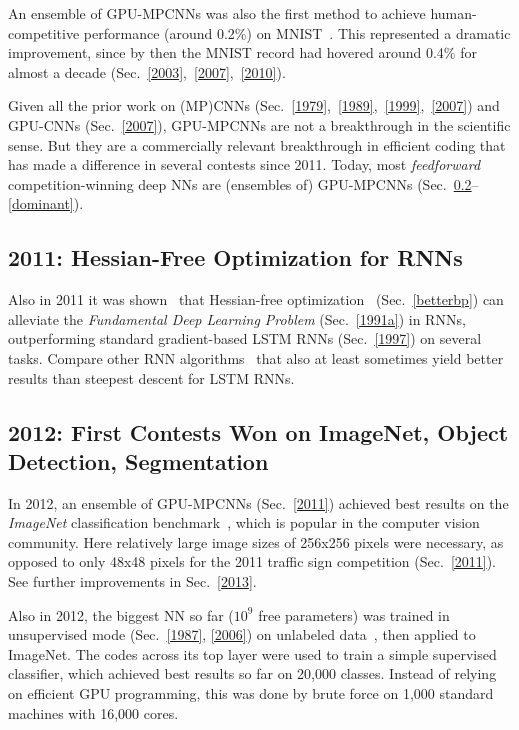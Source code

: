 \documentclass[letterpaper]{article}
\begin{document}
\begin{CJK*}{UTF8}{gbsn}
\begin{sloppypar}
An ensemble of GPU-MPCNNs was also the first method to achieve
human-competitive performance (around 0.2\%) on MNIST~\citep{ciresan2012cvpr}. 
This represented a dramatic improvement, since
by then the MNIST record had hovered around 0.4\% for almost a decade 
(Sec.~\ref{2003},~\ref{2007},~\ref{2010}). 

Given all the prior work on (MP)CNNs (Sec.~\ref{1979},~\ref{1989},~\ref{1999},~\ref{2007}) and GPU-CNNs (Sec.~\ref{2007}), 
GPU-MPCNNs are not a breakthrough in the scientific sense. 
But they are a commercially relevant breakthrough in efficient coding that has made a
difference in several contests since 2011. 
Today, most {\em feedforward} competition-winning deep NNs are (ensembles of) 
GPU-MPCNNs (Sec.~\ref{2012}--\ref{dominant}).

\subsection{2011: Hessian-Free Optimization for RNNs}
\label{2011rnn}

Also in 2011 it was shown~\citep{Martens:2011hessfree} that 
Hessian-free optimization~\citep[e.g.,][]{Moller:93,Pearlmutter:93,schraudolph02} (Sec.~\ref{betterbp})
can alleviate the 
{\em Fundamental Deep Learning Problem} (Sec.~\ref{1991a})
in RNNs, outperforming standard gradient-based 
LSTM RNNs (Sec.~\ref{1997}) on several tasks.
Compare other  RNN algorithms~\citep{Jaeger:04,Schmidhuber:07nc,pascanu2013,icml2014}
that also at least sometimes yield better results than steepest descent for LSTM RNNs.




\subsection{2012: First Contests Won on ImageNet, Object Detection, Segmentation}
\label{2012}

In 2012, an ensemble of GPU-MPCNNs (Sec.~\ref{2011}) 
achieved best results on the {\em ImageNet} classification benchmark~\citep{Krizhevsky:2012},
which is popular in the computer vision community.
Here relatively large image sizes of  256x256 pixels were necessary, 
as opposed to only 48x48 pixels for the 2011 traffic sign competition (Sec.~\ref{2011}).
See further improvements in Sec.~\ref{2013}.

Also in 2012, the biggest NN so far ($10^9$ free parameters) was trained
in unsupervised mode (Sec.~\ref{1987}, \ref{2006}) on unlabeled data~\citep{ng2012}, then applied to ImageNet. The codes across its top layer 
were used to train a simple supervised classifier,
which achieved best results so far on 20,000 classes.
Instead of relying on efficient GPU programming, this was done by brute force on 
1,000 standard machines with 16,000 cores.



\end{sloppypar}
\end{CJK*}
\end{document}
